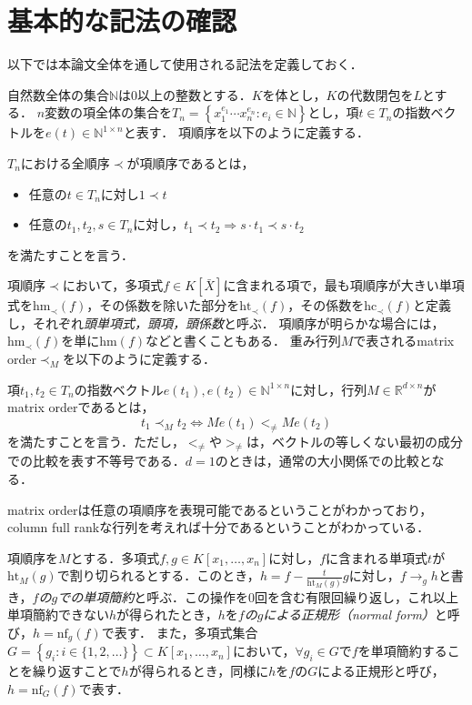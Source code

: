 \section{基本的な記法の確認}
以下では本論文全体を通して使用される記法を定義しておく．
\par
自然数全体の集合$\mathbb{N}$は$0$以上の整数とする．$K$を体とし，$K$の代数閉包を$L$とする．
$n$変数の項全体の集合を$T_n = \left\{ x_1^{e_1} \cdots x_n^{e_n} : e_i \in \mathbb{N} \right\}$とし，項$t \in T_n$の指数ベクトルを$e(t) \in \mathbb{N}^{1\times n}$と表す．
項順序を以下のように定義する．
\begin{definition}[項順序]
	$T_n$における全順序$\prec$が項順序であるとは，
	\begin{itemize}
		\item 任意の$t \in T_n$に対し$1 \prec t$
		\item 任意の$t_1, t_2, s \in T_n$に対し，$t_1 \prec t_2 \Longrightarrow s\cdot t_1 \prec s\cdot t_2$
	\end{itemize}
	を満たすことを言う．
\end{definition}
項順序$\prec$において，多項式$f\in K[\bar{X}]$に含まれる項で，最も項順序が大きい単項式を$\mathrm{hm}_{\prec}(f)$，その係数を除いた部分を$\mathrm{ht}_{\prec}(f)$，その係数を$\mathrm{hc}_{\prec}(f)$と定義し，それぞれ\emph{頭単項式，頭項，頭係数}と呼ぶ．
項順序が明らかな場合には，$\mathrm{hm}_{\prec}(f)$を単に$\mathrm{hm}(f)$などと書くこともある．
重み行列$M$で表されるmatrix order$\prec_M$を以下のように定義する．
\begin{definition}
	項$t_1, t_2 \in T_n$の指数ベクトル$e(t_1), e(t_2) \in \mathbb{N}^{1\times n}$に対し，行列$M \in \mathbb{R}^{d\times n}$がmatrix orderであるとは，
	$$t_1 \prec_M t_2 \Longleftrightarrow Me(t_1) <_{\ne} Me(t_2)$$
	を満たすことを言う．ただし，$<_{\ne}$や$>_{\ne}$は，ベクトルの等しくない最初の成分での比較を表す不等号である．$d=1$のときは，通常の大小関係での比較となる．
\end{definition}
matrix orderは任意の項順序を表現可能\cite{MR826583}であるということがわかっており，column full rankな行列を考えれば十分であるということがわかっている．
\par
項順序を$M$とする．多項式$f, g \in K[x_1,\dots, x_n]$に対し，$f$に含まれる単項式$t$が$\mathrm{ht}_M(g)$で割り切られるとする．このとき，$h = f - \frac{t}{\mathrm{ht}_M(g)}g$に対し，$f \to_g h$と書き，\emph{$f$の$g$での単項簡約}と呼ぶ．この操作を$0$回を含む有限回繰り返し，これ以上単項簡約できない$h$が得られたとき，$h$を\emph{$f$の$g$による正規形（normal form）}と呼び，$h = \mathrm{nf}_g(f)$で表す．
また，多項式集合$G=\left\{g_i :i \in \{1,2, \dots\}\right\} \subset K[x_1, \dots, x_n]$において，$\forall g_i \in G$で$f$を単項簡約することを繰り返すことで$h$が得られるとき，同様に$h$を$f$の$G$による正規形と呼び，$h = \mathrm{nf}_G(f)$で表す．









